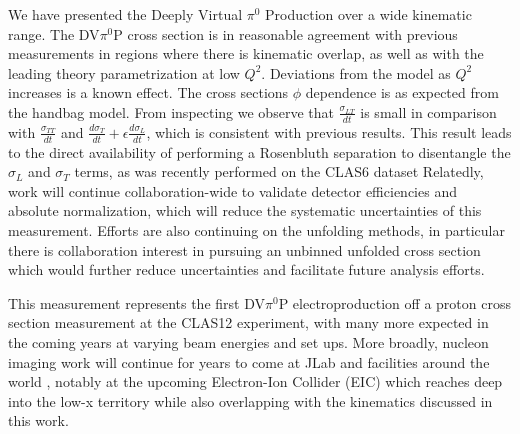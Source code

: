    We have presented the Deeply Virtual $\pi^0$ Production over a wide kinematic range. The DV$\pi^0$P cross section is in reasonable agreement with previous measurements in regions where there is kinematic overlap, as well as with the leading theory parametrization at low $Q^2$. Deviations from the model as $Q^2$ increases is a known effect. The cross sections $\phi$ dependence is as expected from the handbag model. From inspecting  we observe that $\frac{\sigma_{LT}}{dt}$ is small in comparison with $\frac{\sigma_{TT}}{dt}$ and  $\frac{d\sigma_T}{dt} + \epsilon \frac{d\sigma_L}{dt}$, which is consistent with previous results. %
    This result leads to the direct availability of performing a Rosenbluth separation to disentangle the $\sigma_L$ and $\sigma_T$ terms, as was recently  performed on the CLAS6 dataset \parencite{Korover2021RosenbluthProton}
    Relatedly, work will continue collaboration-wide to validate detector efficiencies and absolute normalization, which will reduce the systematic uncertainties of this measurement. Efforts are also continuing on the unfolding methods, in particular there is collaboration interest in pursuing an unbinned unfolded cross section \parencite{Andreassen2020OmniFold:Observables} which would further reduce uncertainties and facilitate future analysis efforts. 
        

     
    This measurement represents the first DV$\pi^0$P electroproduction off a proton cross section measurement at the CLAS12 experiment, with many more expected in the coming years at varying beam energies and set ups. More broadly, nucleon imaging work will continue for years to come at JLab and facilities around the world , notably at the upcoming Electron-Ion Collider (EIC) which reaches deep into the low-x territory while also overlapping with the kinematics discussed in this work. 

